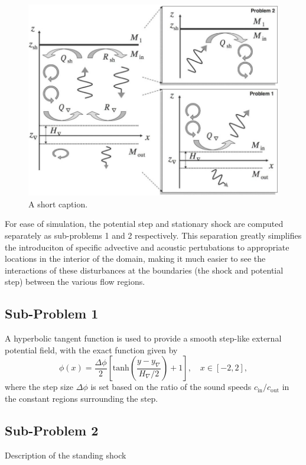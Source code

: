 \begin {figure}
\centering
\includegraphics[width=13cm]{figures/Sato1}
\caption {A short caption.}
\label{fig:Sato1}
\end{figure}

For ease of simulation, the potential step and stationary shock are computed separately as sub-problems 1 and 2 respectively. This separation greatly simplifies the introduciton of specific advective and acoustic pertubations to appropriate locations in the interior of the domain, making it much easier to see the interactions of these disturbances at the boundaries (the shock and potential step) between the various flow regions.

\subsection{Sub-Problem 1}
\label{subsec:sub_problem_1}

A hyperbolic tangent function is used to provide a smooth step-like external potential field, with the exact function given by
\begin{equation}
\phi(x)=\frac{\Delta \phi}{2}\left[\textrm{tanh}\left(\frac{y-y_{\nabla}}{H_{\nabla}/2}\right)+1\right],\quad x\in[-2,2],
\end{equation}
where the step size $\Delta \phi$ is set based on the ratio of the sound speeds $c_{\textrm{in}}/c_{\textrm{out}}$ in the constant regions surrounding the step.

\subsection{Sub-Problem 2}

Description of the standing shock